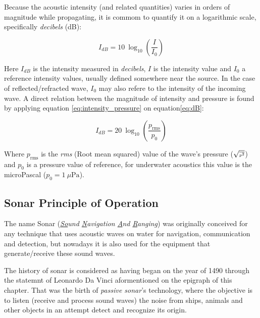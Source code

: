 

Because the acoustic intensity (and related quantities) varies in orders of
magnitude while propagating, it is commom to quantify it on a logarithmic scale,
specifically \textit{decibels} (dB)\cite{LURTON}:

\begin{equation}\label{eq:dB}
I_{dB} = 10~\log_{10}\left(\frac{I}{I_0}\right)
\end{equation} 

Here $I_{dB}$ is the intensity measured in \textit{decibels}, $I$ is the
intensity value and $I_0$ a reference intensity values, usually defined somewhere near the
source. In the case of reflected/refracted wave, $I_0$ may also refere to
the intensity of the incoming wave. A direct relation between the magnitude of
intensity and pressure is found by applying equation \ref{eq:intensity_pressure}
on equation\ref{eq:dB}:

\begin{equation}\label{eq:dB2}
I_{dB} = 20~\log_{10}\left(\frac{p_{\text{rms}}}{p_0}\right)
\end{equation}

Where $p_{\text{rms}}$ is the \textit{rms} (Root mean squared) value of the
wave's pressure ({\small $\sqrt{\text{\tiny \(\overline{p^2}\)}}$}) and $p_0$ is
a pressure value of reference, for underwater acoustics this value is the
microPascal (\(p_0 = 1~\mu\text{Pa} \))\cite{LURTON}.


\subsection{Sonar Principle of Operation}

The name Sonar (\textit{\underline{So}und \underline{N}avigation \underline{A}nd
\underline{R}anging}) was originally conceived for any technique that uses
acoustic waves on water for navigation, communication and detection, but
nowadays it is also used for the equipment that generate/receive these
sound waves.

The history of sonar is considered as having began on the year of 1490 through
the statemnt of Leonardo Da Vinci aformentioned on the epigraph 
of this chapter\cite{fahy1998fundamentals}. That was the birth of
\textit{passive sonar}'s technology, where the objective is to listen (receive
and process sound waves) the noise from ships, animals and other objects in an attempt detect and
recognize its origin. 


